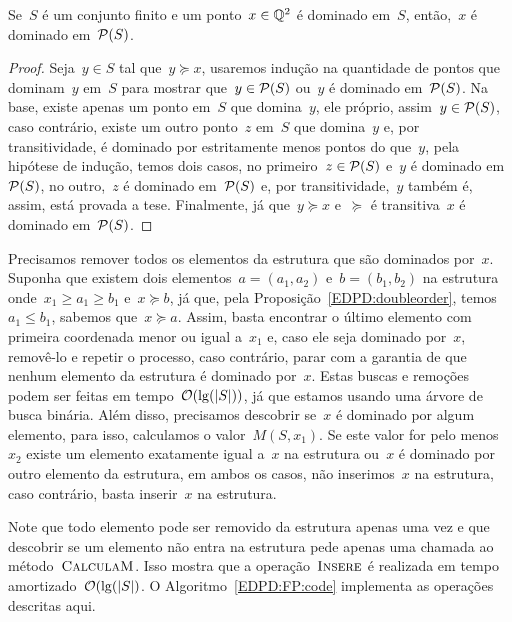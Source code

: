 \begin{prop} \label{EDPD:DomP}
Se~$S$ é um conjunto finito e um ponto~$x \in \mathbb{Q}^2$ é dominado em~$S$, então,~$x$ é dominado em~$\mathcal{P}(S)$.
\end{prop}
\begin{proof}
Seja~$y \in S$ tal que~$y \succeq x$, usaremos indução na quantidade de pontos que dominam~$y$ em~$S$ para mostrar que~$y \in \mathcal{P}(S)$ ou~$y$ é dominado em~$\mathcal{P}(S)$. Na base, existe apenas um ponto em~$S$ que domina~$y$, ele próprio, assim~$y \in \mathcal{P}(S)$, caso contrário, existe um outro ponto~$z$ em~$S$ que domina~$y$ e, por transitividade, é dominado por estritamente menos pontos do que~$y$, pela hipótese de indução, temos dois casos, no primeiro~$z \in \mathcal{P}(S)$ e~$y$ é dominado em~$\mathcal{P}(S)$, no outro,~$z$ é dominado em~$\mathcal{P}(S)$ e, por transitividade,~$y$ também é, assim, está provada a tese. Finalmente, já que~$y \succeq x$ e~$\succeq$ é transitiva~$x$ é dominado em~$\mathcal{P}(S)$.
\end{proof}

Precisamos remover todos os elementos da estrutura que são dominados por~$x$. Suponha que existem dois elementos~$a = (a_1,a_2)$ e~$b = (b_1,b_2)$ na estrutura onde~$x_1 \geq a_1 \geq b_1$ e~$x \succeq b$, já que, pela Proposição~\ref{EDPD:doubleorder}, temos~$a_1 \leq b_1$, sabemos que~$x \succeq a$. Assim, basta encontrar o último elemento com primeira coordenada menor ou igual a~$x_1$ e, caso ele seja dominado por~$x$, removê-lo e repetir o processo, caso contrário, parar com a garantia de que nenhum elemento da estrutura é dominado por~$x$. Estas buscas e remoções podem ser feitas em tempo~$\mathcal{O}(\lg(|S|))$, já que estamos usando uma árvore de busca binária. Além disso, precisamos descobrir se~$x$ é dominado por algum elemento, para isso, calculamos o valor~$M(S,x_1)$. Se este valor for pelo menos~$x_2$ existe um elemento exatamente igual a~$x$ na estrutura ou~$x$ é dominado por outro elemento da estrutura, em ambos os casos, não inserimos~$x$ na estrutura, caso contrário, basta inserir~$x$ na estrutura.

Note que todo elemento pode ser removido da estrutura apenas uma vez e que descobrir se um elemento não entra na estrutura pede apenas uma chamada ao método~$\textsc{CalculaM}$. Isso mostra que a operação~$\textsc{Insere}$ é realizada em tempo amortizado~$\mathcal{O}(\lg(|S|)$. O Algoritmo~\ref{EDPD:FP:code} implementa as operações descritas aqui.

